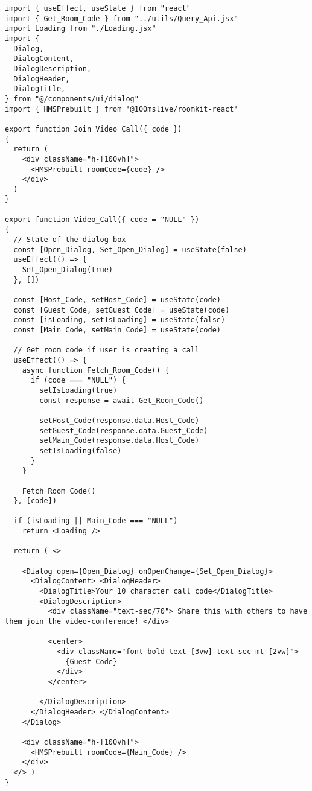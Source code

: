 \begin{verbatim}
import { useEffect, useState } from "react"
import { Get_Room_Code } from "../utils/Query_Api.jsx"
import Loading from "./Loading.jsx"
import {
  Dialog,
  DialogContent,
  DialogDescription,
  DialogHeader,
  DialogTitle,
} from "@/components/ui/dialog"
import { HMSPrebuilt } from '@100mslive/roomkit-react'

export function Join_Video_Call({ code })
{
  return (
    <div className="h-[100vh]">
      <HMSPrebuilt roomCode={code} />
    </div>
  )
}

export function Video_Call({ code = "NULL" })
{
  // State of the dialog box
  const [Open_Dialog, Set_Open_Dialog] = useState(false)
  useEffect(() => {
    Set_Open_Dialog(true)
  }, [])

  const [Host_Code, setHost_Code] = useState(code)
  const [Guest_Code, setGuest_Code] = useState(code)
  const [isLoading, setIsLoading] = useState(false)
  const [Main_Code, setMain_Code] = useState(code)

  // Get room code if user is creating a call
  useEffect(() => {
    async function Fetch_Room_Code() {
      if (code === "NULL") {
        setIsLoading(true)
        const response = await Get_Room_Code()

        setHost_Code(response.data.Host_Code)
        setGuest_Code(response.data.Guest_Code)
        setMain_Code(response.data.Host_Code)
        setIsLoading(false)
      }
    }

    Fetch_Room_Code()
  }, [code])

  if (isLoading || Main_Code === "NULL")
    return <Loading />

  return ( <>

    <Dialog open={Open_Dialog} onOpenChange={Set_Open_Dialog}>
      <DialogContent> <DialogHeader>
        <DialogTitle>Your 10 character call code</DialogTitle>
        <DialogDescription>
          <div className="text-sec/70"> Share this with others to have them join the video-conference! </div>

          <center>
            <div className="font-bold text-[3vw] text-sec mt-[2vw]">
              {Guest_Code}
            </div>
          </center>

        </DialogDescription>
      </DialogHeader> </DialogContent>
    </Dialog>

    <div className="h-[100vh]">
      <HMSPrebuilt roomCode={Main_Code} />
    </div>
  </> )
}
\end{verbatim}
